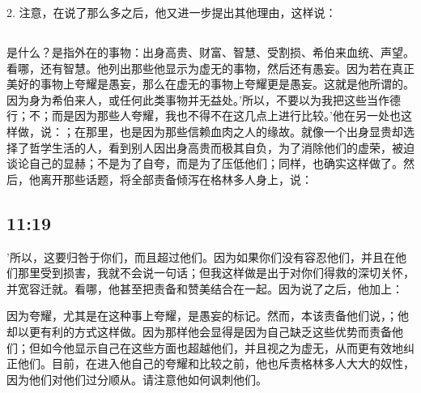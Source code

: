 2. 注意，在说了那么多之后，他又进一步提出其他理由，这样说：\par


\subsection{}

\par

是什么？是指外在的事物：出身高贵、财富、智慧、受割损、希伯来血统、声望。看哪，还有智慧。他列出那些他显示为虚无的事物，然后还有愚妄。因为若在真正美好的事物上夸耀是愚妄，那么在虚无的事物上夸耀更是愚妄。这就是他所谓的。因为身为希伯来人，或任何此类事物并无益处。'所以，不要以为我把这些当作德行；不；而是因为那些人夸耀，我也不得不在这几点上进行比较。'他在另一处也这样做，说：；在那里，也是因为那些信赖血肉之人的缘故。就像一个出身显贵却选择了哲学生活的人，看到别人因出身高贵而极其自负，为了消除他们的虚荣，被迫谈论自己的显赫；不是为了自夸，而是为了压低他们；同样，也确实这样做了。然后，他离开那些话题，将全部责备倾泻在格林多人身上，说：\par


\subsection{ 11:19}

'所以，这要归咎于你们，而且超过他们。因为如果你们没有容忍他们，并且在他们那里受到损害，我就不会说一句话；但我这样做是出于对你们得救的深切关怀，并宽容迁就。看哪，他甚至把责备和赞美结合在一起。因为说了之后，他加上：\par

因为夸耀，尤其是在这种事上夸耀，是愚妄的标记。然而，本该责备他们说，；他却以更有利的方式这样做。因为那样他会显得是因为自己缺乏这些优势而责备他们；但如今他显示自己在这些方面也超越他们，并且视之为虚无，从而更有效地纠正他们。目前，在进入他自己的夸耀和比较之前，他也斥责格林多人大大的奴性，因为他们对他们过分顺从。请注意他如何讽刺他们。\par

